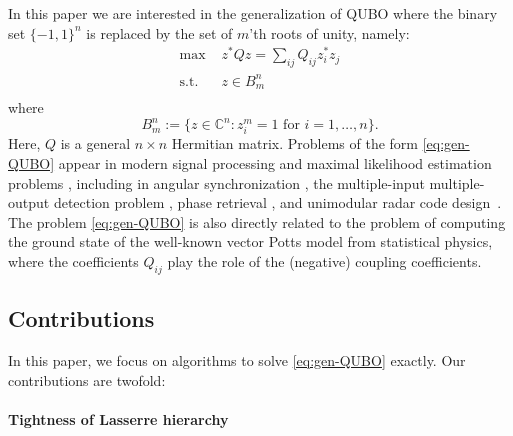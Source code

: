 \documentclass{article}
\theoremstyle{definition}
\begin{document}
In this paper we are interested in the generalization of QUBO where the binary set $\{-1,1\}^n$ is replaced by the set of $m$'th roots of unity, namely:
\begin{equation} \label{eq:gen-QUBO}
    \begin{aligned}
        \text{max } & z^* Qz = \sum_{ij} Q_{ij} z_i^* z_j\\
        \text{s.t. }&  z\in B_m^n\\
    \end{aligned}
\end{equation}
where
\begin{equation}
    B_m^n := \{z \in \mathbb{C}^n: z_i^m = 1 \text{ for } i = 1,\dots,n\}.
\end{equation}
Here, $Q$ is a general $n\times n$ Hermitian matrix. Problems of the form \eqref{eq:gen-QUBO} appear in modern signal processing and maximal likelihood estimation problems \cite{so2008probabilistic}, including in angular synchronization \cite{bandeira2017tightness}, the multiple-input multiple-output detection problem \cite{jiang2021tightness,lu2019tightness,mobasher2007near}, phase retrieval \cite{waldspurger2015phase}, and unimodular radar code design~\cite{soltanalian2014designing,lu2020enhanced}. The problem \eqref{eq:gen-QUBO} is also directly related to the problem of computing the ground state of the well-known vector Potts model \cite{pottsmodel} from statistical physics, where the coefficients $Q_{ij}$ play the role of the (negative) coupling coefficients.

\subsection{Contributions}\label{sec:contributions}

In this paper, we focus on algorithms to solve \eqref{eq:gen-QUBO} exactly. Our contributions are twofold:

\paragraph{Tightness of Lasserre hierarchy} 
\end{document}
